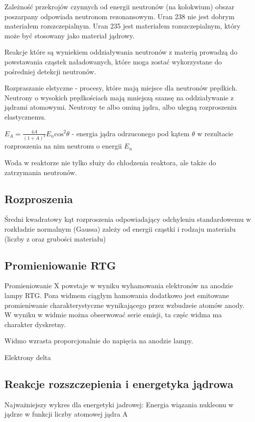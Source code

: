 \documentclass{article}
\begin{document}
Zależność przekrojów czynnych od energii neutronów (na kolokwium) obszar poszarpany odpowiada neutronom rezonansowym. Uran 238 nie jest dobrym materiałem rozszczepialnym. Uran 235 jest materiałem rozszczepialnym, który może być stosowany jako materiał jądrowy.

Reakcje które są wyniekiem oddziaływania neutronów z materią prowadzą do powstawania cząstek naładowanych, które moga zostać wykorzystane do pośredniej detekcji neutronów.

Rozpraszanie elstyczne - procesy, które mają miejsce dla neutronów prędkich. Neutrony o wysokich prędkościach mają mniejszą szansę na oddziaływanie z jądrami atomowymi. Neutrony te albo ominą jądra, albo ulegną rozproszeniu elastycznemu.

$E_A = \frac{4A}{(1+A)^2}E_n\mathrm{cos}^2\theta$ - energia jądra odrzuconego pod kątem $\theta$ w rezultacie rozproszenia na nim neutronu o energii $E_n$

Woda w reaktorze nie tylko służy do chłodzenia reaktora, ale także do zatrzymania neutronów.

\subsection{Rozproszenia}

Średni kwadratowy kąt rozproszenia odpowiadający odchyleniu standardowemu w rozkładzie normalnym (Gaussa) zależy od energii cząstki i rodzaju materiału (liczby z oraz grubości materiału)

\subsection{Promieniowanie RTG}

Promieniowanie X powstaje w wyniku wyhamowania elektronów na anodzie lampy RTG. Poza widmem ciągłym hamowania dodatkowo jest emitowane promieniwanie charakterystyczne wynikającego przez wzbudzeie atomów anody. W wyniku w widmie można obserwować serie emisji, ta częśc widma ma charakter dyskretny.

Widmo wzrasta proporcjonalnie do napięcia na anodzie lampy.

Elektrony delta

\subsection{Reakcje rozszczepienia i energetyka jądrowa}

Najważniejszy wykres dla energetyki jadrowej: Energia wiązania nukleonu w jądrze w funkcji liczby atomowej jądra A
\end{document}
